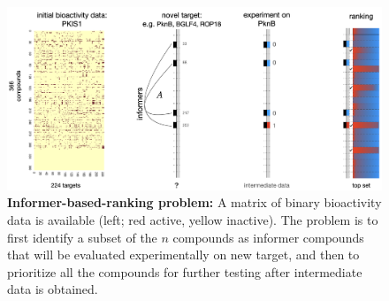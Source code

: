 \documentclass[11pt,a4paper]{article}
\theoremstyle{plain}
\begin{document}
\begin{figure}[!ht]
\centering
\includegraphics[width=5.5in]{Figs/IBR_scheme_PKIS1.png}
\caption{\label{fig:IBR_scheme} 
{\bf Informer-based-ranking problem:} A matrix of binary bioactivity data 
is available (left; red active, yellow inactive).  The problem is to first identify a subset of the $n$ compounds as informer compounds
that will be evaluated experimentally on new target, and then to prioritize
all the compounds for further testing after intermediate
data is obtained. }
\end{figure}

\end{document}
